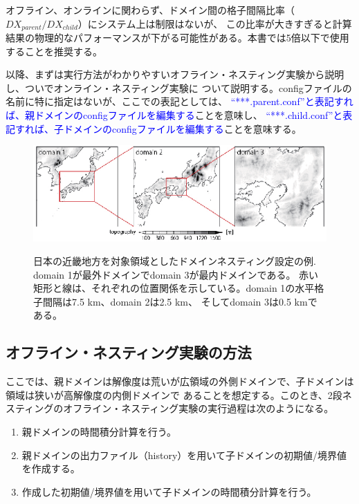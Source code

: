 オフライン、オンラインに関わらず、ドメイン間の格子間隔比率（$DX_{parent}/DX_{child}$）にシステム上は制限はないが、
この比率が大きすぎると計算結果の物理的なパフォーマンスが下がる可能性がある。本書では5倍以下で使用することを推奨する。

以降、まずは実行方法がわかりやすいオフライン・ネスティング実験から説明し、ついでオンライン・ネスティング実験に
ついて説明する。configファイルの名前に特に指定はないが、ここでの表記としては、
\textcolor{blue}{``***.parent.conf''と表記すれば、親ドメインのconfigファイルを編集する}ことを意味し、
\textcolor{blue}{``***.child.conf''と表記すれば、子ドメインのconfigファイルを編集する}ことを意味する。


\begin{figure}[t]
\begin{center}
  \includegraphics[width=1.0\hsize]{./figure/nesting_sample.eps}\\
  \caption{日本の近畿地方を対象領域としたドメインネスティング設定の例. domain 1が最外ドメインでdomain 3が最内ドメインである。
           赤い矩形と線は、それぞれの位置関係を示している。domain 1の水平格子間隔は7.5 km、domain 2は2.5 km、
           そしてdomain 3は0.5 kmである。}
  \label{fig_nestsample}
\end{center}
\end{figure}


\subsection{オフライン・ネスティング実験の方法} \label{sec:nest_offline}

ここでは、親ドメインは解像度は荒いが広領域の外側ドメインで、子ドメインは領域は狭いが高解像度の内側ドメインで
あることを想定する。このとき、2段ネスティングのオフライン・ネスティング実験の実行過程は次のようになる。

{\gt
\begin{enumerate}
 \item 親ドメインの時間積分計算を行う。
 \item 親ドメインの出力ファイル（history）を用いて子ドメインの初期値/境界値を作成する。
 \item 作成した初期値/境界値を用いて子ドメインの時間積分計算を行う。
\end{enumerate}
}

